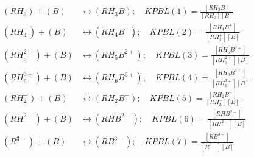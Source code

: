 \documentclass[fleqn, oneside, 11pt]{article}%
\begin{document}
\begin{preview}
\begin{align*}%
(RH_{3}) + (B) & \leftrightarrow (RH_{3}B); \quad KPBL(1)=\frac{[RH_{3}B]}{[RH_{3}][B]} \nonumber \\ 
(RH^{+}_{4}) + (B) & \leftrightarrow (RH_{4}B^{+}); \quad KPBL(2)=\frac{[RH_{4}B^{+}]}{[RH^{+}_{4}][B]} \nonumber \\ 
(RH^{2+}_{5}) + (B) & \leftrightarrow (RH_{5}B^{2+}); \quad KPBL(3)=\frac{[RH_{5}B^{2+}]}{[RH^{2+}_{5}][B]} \nonumber \\ 
(RH^{3+}_{6}) + (B) & \leftrightarrow (RH_{6}B^{3+}); \quad KPBL(4)=\frac{[RH_{6}B^{3+}]}{[RH^{3+}_{6}][B]} \nonumber \\ 
(RH^{-}_{2}) + (B) & \leftrightarrow (RH_{2}B^{-}); \quad KPBL(5)=\frac{[RH_{2}B^{-}]}{[RH^{-}_{2}][B]} \nonumber \\ 
(RH^{2-}) + (B) & \leftrightarrow (RHB^{2-}); \quad KPBL(6)=\frac{[RHB^{2-}]}{[RH^{2-}][B]} \nonumber \\ 
(R^{3-}) + (B) & \leftrightarrow (RB^{3-}); \quad KPBL(7)=\frac{[RB^{3-}]}{[R^{3-}][B]} \nonumber \\ 
\end{align*} 
\end{preview}
\end{document}
